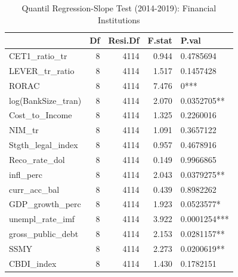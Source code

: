 \begin{table}[ht]
\centering
\caption{Quantil Regression-Slope Test (2014-2019): Financial Institutions} 
\begingroup\small
\begin{tabular}{lrrrl}
  \toprule
 & Df & Resi.Df & F.stat & P.val \\ 
  \midrule
CET1\_ratio\_tr & 8 & 4114 & 0.944 & 0.4785694 \\ 
  LEVER\_tr\_ratio & 8 & 4114 & 1.517 & 0.1457428 \\ 
  RORAC & 8 & 4114 & 7.476 & 0*** \\ 
  log(BankSize\_tran) & 8 & 4114 & 2.070 & 0.0352705** \\ 
  Cost\_to\_Income & 8 & 4114 & 1.325 & 0.2260016 \\ 
  NIM\_tr & 8 & 4114 & 1.091 & 0.3657122 \\ 
  Stgth\_legal\_index & 8 & 4114 & 0.957 & 0.4678916 \\ 
  Reco\_rate\_dol & 8 & 4114 & 0.149 & 0.9966865 \\ 
  infl\_perc & 8 & 4114 & 2.043 & 0.0379275** \\ 
  curr\_acc\_bal & 8 & 4114 & 0.439 & 0.8982262 \\ 
  GDP\_growth\_perc & 8 & 4114 & 1.923 & 0.0523577* \\ 
  unempl\_rate\_imf & 8 & 4114 & 3.922 & 0.0001254*** \\ 
  gross\_public\_debt & 8 & 4114 & 2.153 & 0.0281157** \\ 
  SSMY & 8 & 4114 & 2.273 & 0.0200619** \\ 
  CBDI\_index & 8 & 4114 & 1.430 & 0.1782151 \\ 
   \bottomrule
\end{tabular}
\endgroup
\end{table}
